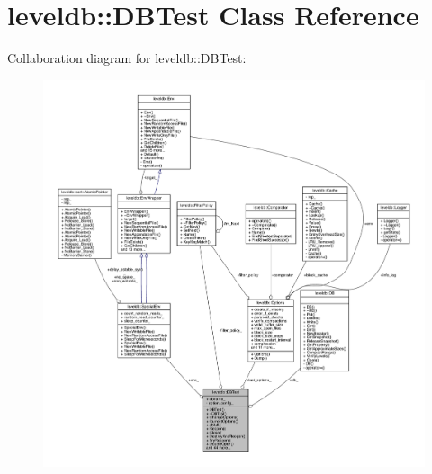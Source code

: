 \hypertarget{classleveldb_1_1_d_b_test}{}\section{leveldb\+:\+:D\+B\+Test Class Reference}
\label{classleveldb_1_1_d_b_test}


Collaboration diagram for leveldb\+:\+:D\+B\+Test\+:
\nopagebreak
\begin{figure}[H]
\begin{center}
\leavevmode
\includegraphics[width=350pt]{classleveldb_1_1_d_b_test__coll__graph}
\end{center}
\end{figure}
